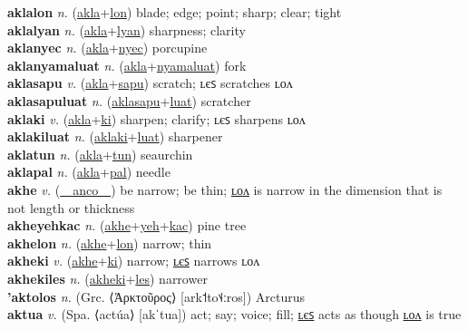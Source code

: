\textbf{aklalon} \textit{n.} (\hyperref[akla]{akla}+\hyperref[lon]{lon})
blade; edge; point; sharp; clear; tight \label{aklalon} \\
\textbf{aklalyan} \textit{n.} (\hyperref[akla]{akla}+\hyperref[lyan]{lyan})
sharpness; clarity \label{aklalyan} \\
\textbf{aklanyec} \textit{n.} (\hyperref[akla]{akla}+\hyperref[nyec]{nyec})
porcupine \label{aklanyec} \\
\textbf{aklanyamaluat} \textit{n.} (\hyperref[akla]{akla}+\hyperref[nyamaluat]{nyamaluat})
fork \label{aklanyamaluat} \\
\textbf{aklasapu} \textit{v.} (\hyperref[akla]{akla}+\hyperref[sapu]{sapu})
scratch; ʟєꜱ scratches ʟᴏᴧ \label{aklasapu} \\
\textbf{aklasapuluat} \textit{n.} (\hyperref[aklasapu]{aklasapu}+\hyperref[luat]{luat})
scratcher \label{aklasapuluat} \\
\textbf{aklaki} \textit{v.} (\hyperref[akla]{akla}+\hyperref[ki]{ki})
sharpen; clarify; ʟєꜱ sharpens ʟᴏᴧ \label{aklaki} \\
\textbf{aklakiluat} \textit{n.} (\hyperref[aklaki]{aklaki}+\hyperref[luat]{luat})
sharpener \label{aklakiluat} \\
\textbf{aklatun} \textit{n.} (\hyperref[akla]{akla}+\hyperref[tun]{tun})
seaurchin \label{aklatun} \\
\textbf{aklapal} \textit{n.} (\hyperref[akla]{akla}+\hyperref[pal]{pal})
needle \label{aklapal} \\
\textbf{akhe} \textit{v.} (\hyperref[anco]{~~anco~~})
be narrow; be thin; \hyperref[akhelon]{ʟᴏᴧ} is narrow in the dimension that is not length or thickness \label{akhe} \\
\textbf{akheyehkac} \textit{n.} (\hyperref[akhe]{akhe}+\hyperref[yeh]{yeh}+\hyperref[kac]{kac})
pine tree \label{akheyehkac} \\
\textbf{akhelon} \textit{n.} (\hyperref[akhe]{akhe}+\hyperref[lon]{lon})
narrow; thin \label{akhelon} \\
\textbf{akheki} \textit{v.} (\hyperref[akhe]{akhe}+\hyperref[ki]{ki})
narrow; \hyperref[akhekiles]{ʟєꜱ} narrows ʟᴏᴧ \label{akheki} \\
\textbf{akhekiles} \textit{n.} (\hyperref[akheki]{akheki}+\hyperref[les]{les})
narrower \label{akhekiles} \\
\textbf{'aktolos} \textit{n.} (Grc. ⟨Ἀρκτοῦρος⟩ [ark˦to˦˨ːros])
Arcturus \label{'aktolos} \\
\textbf{aktua} \textit{v.} (Spa. ⟨actúa⟩ [akˈtua])
act; say; voice; fill; \hyperref[aktuales]{ʟєꜱ} acts as though \hyperref[aktualon]{ʟᴏᴧ} is true \label{aktua} \\
